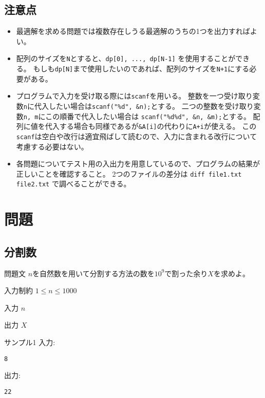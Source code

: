 \documentclass[a4paper,twoside,onecolumn,openany,article,10pt]{memoir}
\theoremstyle{remark}
\begin{document}
\subsection{注意点}
\begin{itemize}
\item 最適解を求める問題では複数存在しうる最適解のうちの1つを出力すればよい。
\item 配列のサイズを\texttt{N}とすると、\texttt{dp[0], ..., dp[N-1]} を使用することができる。
もしも\texttt{dp[N]}まで使用したいのであれば、配列のサイズを\texttt{N+1}にする必要がある。
\item プログラムで入力を受け取る際には\texttt{scanf}を用いる。
整数を一つ受け取り変数\texttt{n}に代入したい場合は\texttt{scanf("\%d", \&n);}とする。
二つの整数を受け取り変数\texttt{n, m}にこの順番で代入したい場合は
\texttt{scanf("\%d\%d", \&n, \&m);}とする。
配列に値を代入する場合も同様であるが\texttt{\&A[i]}の代わりに\texttt{A+i}が使える。
この\texttt{scanf}は空白や改行は適宜飛ばして読むので、入力に含まれる改行について考慮する必要はない。
\item 各問題についてテスト用の入出力を用意しているので、プログラムの結果が正しいことを確認すること。
2つのファイルの差分は \texttt{diff file1.txt file2.txt} で調べることができる。
\end{itemize}

\clearpage
\section{問題}
\subsection{分割数}
\begin{itembox}[l]{問題文}
$n$を自然数を用いて分割する方法の数を$10^9$で割った余り$X$を求めよ。
\end{itembox}

\begin{itembox}[l]{入力制約}
$1\le n\le 1000$
\end{itembox}

\begin{itembox}[l]{入力}
$n$
\end{itembox}

\begin{itembox}[l]{出力}
$X$
\end{itembox}

\begin{itembox}[l]{サンプル1}
入力:
\begin{verbatim}
8
\end{verbatim}
出力:
\begin{verbatim}
22
\end{verbatim}
\end{itembox}
\end{document}
